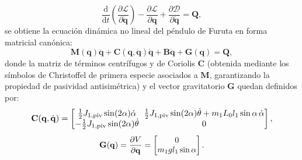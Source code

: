\begin{equation}
    \frac{\mathrm{d}}{\mathrm{d}t}\!\left(\frac{\partial\mathcal{L}}{\partial\dot{\mathbf{q}}}\right) - \frac{\partial\mathcal{L}}{\partial\mathbf{q}} + \frac{\partial\mathcal{D}}{\partial\dot{\mathbf{q}}} = \mathbf{Q},
    \label{eq:euler_lagrange_op}
\end{equation}
se obtiene la ecuación dinámica no lineal del péndulo de Furuta en forma matricial canónica:
\begin{equation}
    \mathbf{M}(\mathbf{q})\ddot{\mathbf{q}} + \mathbf{C}(\mathbf{q},\dot{\mathbf{q}})\dot{\mathbf{q}} + \mathbf{B}\dot{\mathbf{q}} + \mathbf{G}(\mathbf{q}) = \mathbf{Q},
    \label{eq:dinamica_theta}
\end{equation}
donde la matriz de términos centrífugos y de Coriolis $\mathbf{C}$ (obtenida mediante los símbolos de Christoffel de primera especie asociados a $\mathbf{M}$, garantizando la propiedad de pasividad antisimétrica) y el vector gravitatorio $\mathbf{G}$ quedan definidos por:
\begin{gather}
    \resizebox{0.86\columnwidth}{!}{$\displaystyle
        \setlength{\arraycolsep}{3pt}
        \mathbf{C}(\mathbf{q},\dot{\mathbf{q}}) =
        \begin{bmatrix}
            \tfrac{1}{2}J_{1,\text{piv}}\sin(2\alpha)\dot{\alpha} & \tfrac{1}{2}J_{1,\text{piv}}\sin(2\alpha)\dot{\theta} + m_1 L_0 l_1\sin\alpha\,\dot{\alpha} \\
            -\tfrac{1}{2}J_{1,\text{piv}}\sin(2\alpha)\dot{\theta} & 0
        \end{bmatrix},
    $} \label{eq:matriz_coriolis} \\[4pt]
    \mathbf{G}(\mathbf{q}) = \frac{\partial V}{\partial\mathbf{q}} =
    \begin{bmatrix}
        0 \\ m_1 g l_1\sin\alpha
    \end{bmatrix}. \label{eq:dinamica_alpha}
\end{gather}

